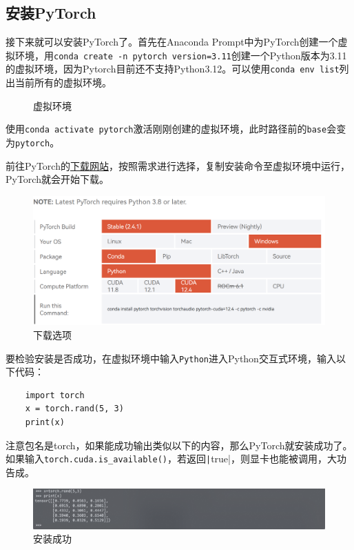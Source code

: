 \documentclass[fontset=ubuntu]{ctexart}
\begin{document}
\subsection{安装PyTorch}
接下来就可以安装PyTorch了。首先在Anaconda Prompt中为PyTorch创建一个虚拟环境，用\verb|conda create -n pytorch version=3.11|创建一个Python版本为3.11的虚拟环境，因为Pytorch目前还不支持Python3.12。可以使用\verb|conda env list|列出当前所有的虚拟环境。
\begin{figure}[htb]
    \centering
    \caption{虚拟环境}
    \label{conda}
\end{figure}

使用\verb|conda activate pytorch|激活刚刚创建的虚拟环境，此时路径前的\verb|base|会变为\verb|pytorch|。

前往PyTorch的\href{https://pytorch.org/get-started/locally/}{下载网站}，按照需求进行选择，复制安装命令至虚拟环境中运行，PyTorch就会开始下载。
\begin{figure}[htb]
    \centering
    \includegraphics[width=0.5\linewidth]{conda_4.png}
    \caption{下载选项}
    \label{fig:conda_4}
\end{figure}

要检验安装是否成功，在虚拟环境中输入\verb|Python|进入Python交互式环境，输入以下代码：
\begin{listing}[htb]
    \begin{verbatim}
    import torch
    x = torch.rand(5, 3)
    print(x)
    \end{verbatim}
\end{listing}

注意包名是torch，如果能成功输出类似以下的内容，那么PyTorch就安装成功了。如果输入\verb|torch.cuda.is_available()|，若返回\texttt|true|，则显卡也能被调用，大功告成。
\begin{figure}[htb]
    \centering
    \includegraphics[width=0.75\linewidth]{conda_5.png}
    \caption{安装成功}
    \label{fig:conda_5}
\end{figure}
\end{document}
